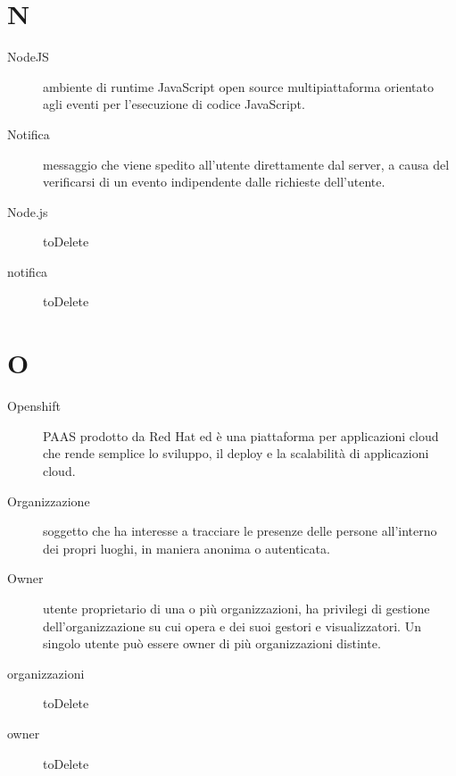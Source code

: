 \documentclass{article}
\begin{document}
  \section{N}
  \begin{description}
    \item[NodeJS] ambiente di runtime JavaScript open source multipiattaforma orientato agli eventi per l'esecuzione di codice JavaScript.
    \item[Notifica] messaggio che viene spedito all'utente direttamente dal server, a causa del verificarsi di un evento indipendente dalle richieste dell'utente.
    \item[Node.js] toDelete
    \item[notifica] toDelete
	\end{description}
  \section{O}
  \begin{description}
    \item[Openshift] PAAS prodotto da Red Hat ed è una piattaforma per applicazioni cloud che rende semplice lo sviluppo, il deploy e la scalabilità di applicazioni cloud.
    \item[Organizzazione] soggetto che ha interesse a tracciare le presenze delle persone all'interno dei propri luoghi, in maniera anonima o autenticata.
    \item[Owner] utente proprietario di una o più organizzazioni, ha privilegi di gestione dell'organizzazione su cui opera e dei suoi gestori e visualizzatori. Un singolo utente può essere owner di più organizzazioni distinte.
    \item[organizzazioni] toDelete
    \item[owner] toDelete
	\end{description}
\end{document}
